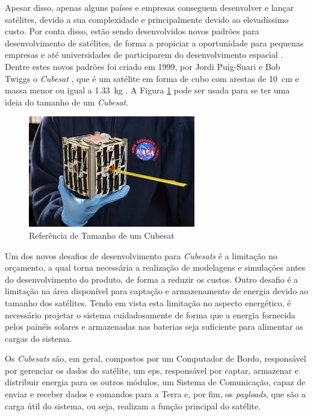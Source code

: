 Apesar disso, apenas alguns países e empresas conseguem desenvolver e lançar satélites, devido a sua complexidade e principalmente devido ao elevadíssimo custo. Por conta disso, estão sendo desenvolvidos novos padrões para desenvolvimento de satélites, de forma a propiciar a oportunidade para pequenas empresas e até universidades de participarem do desenvolvimento espacial \cite{Baker2008}. Dentre estes novos padrões foi criado em 1999, por Jordi Puig-Suari e Bob Twiggs o \textit{Cubesat} \cite{Messier2015}, que é um satélite em forma de cubo com arestas de \SI{10}{\centi\metre} e massa menor ou igual a \SI{1,33}{\kilo\gram} \cite{cubesatDesignSpecification2014}. A Figura \ref{figura_cubesat} pode ser usada para se ter uma ideia do tamanho de um \textit{Cubesat}.

\begin{figure}[!htpb]
\begin{center}
\includegraphics[scale=0.5]{figures/cubesat.jpg}
\caption{Referência de Tamanho de um Cubesat}
\label{figura_cubesat}
\end{center}
\end{figure}

Um dos novos desafios de desenvolvimento para \textit{Cubesats} é a limitação no orçamento, a qual torna necessária a realização de modelagens e simulações antes do desenvolvimento do produto, de forma a reduzir os custos. Outro desafio é a limitação na área disponível para captação e armazenamento de energia devido ao tamanho dos satélites\cite{Kalman2011}. Tendo em vista esta limitação no aspecto energético, é necessário projetar o sistema cuidadosamente de forma que a energia fornecida pelos painéis solares e armazenadas nas baterias seja suficiente para alimentar as cargas do sistema.

Os \textit{Cubesats} são, em geral, compostos por um Computador de Bordo, responsável por gerenciar os dados do satélite, um \gls{eps}, responsável por captar, armazenar e distribuir energia para os outros módulos, um Sistema de Comunicação, capaz de enviar e receber dados e comandos para a Terra e, por fim, os \textit{payloads}, que são a carga útil do sistema, ou seja, realizam a função principal do satélite.

